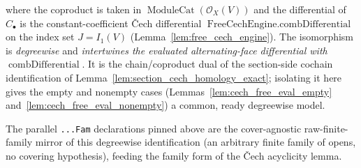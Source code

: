 \begin{lemma}
\[  \]
  where the coproduct is taken in \(\operatorname{ModuleCat}(\mathcal{O}_X(V))\) and the
  differential of \(C_\bullet\) is the constant-coefficient {\v C}ech differential
  \(\operatorname{FreeCechEngine.combDifferential}\) on the index set \(J = I_1(V)\)
  (Lemma~\ref{lem:free_cech_engine}). The isomorphism is \emph{degreewise} and
  \emph{intertwines the evaluated alternating-face differential with}
  \(\operatorname{combDifferential}\). It is the chain/coproduct dual of the section-side
  cochain identification of Lemma~\ref{lem:section_cech_homology_exact}; isolating it
  here gives the empty and nonempty cases (Lemmas~\ref{lem:cech_free_eval_empty}
  and~\ref{lem:cech_free_eval_nonempty}) a common, ready degreewise model.

  The parallel \texttt{...Fam} declarations pinned above are the cover-agnostic
  raw-finite-family mirror of this degreewise identification (an arbitrary finite
  family of opens, no covering hypothesis), feeding the family form of the {\v C}ech
  acyclicity lemma.
\end{lemma}

